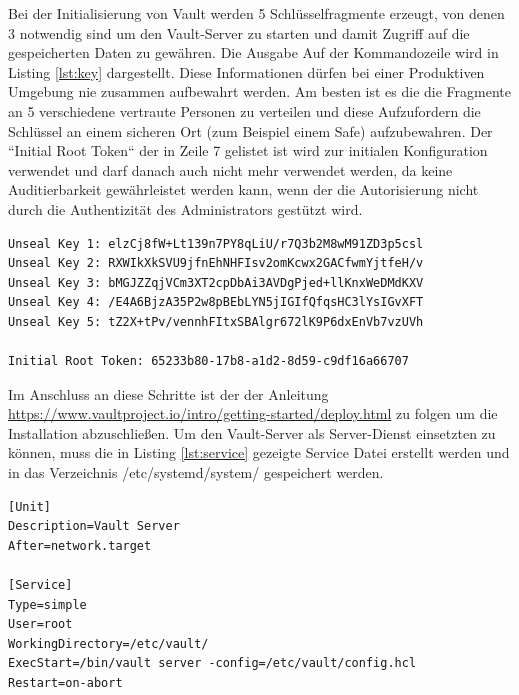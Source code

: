 \documentclass[
book,
a4paper,   
titlepage,  
halfparskip,
12pt        
]{scrartcl}
\begin{document}
\begin{onehalfspacing}
Bei der Initialisierung von Vault werden 5 Schlüsselfragmente erzeugt, von denen 3 notwendig sind um den Vault-Server zu starten und damit Zugriff auf die gespeicherten Daten zu gewähren. Die Ausgabe Auf der Kommandozeile wird in Listing \vref{lst:key} dargestellt.
Diese Informationen dürfen bei einer Produktiven Umgebung nie zusammen aufbewahrt werden. Am besten ist es die die Fragmente an 5 verschiedene vertraute Personen zu verteilen und diese Aufzufordern die Schlüssel an einem sicheren Ort (zum Beispiel einem Safe) aufzubewahren. Der ``Initial Root Token`` der in Zeile 7 gelistet ist wird zur initialen Konfiguration verwendet und darf danach auch nicht mehr verwendet werden, da keine Auditierbarkeit gewährleistet werden kann, wenn der die Autorisierung nicht durch die Authentizität des Administrators gestützt wird.

\begin{lstlisting}[caption={[Initialisierung Vault] Ausgabe der 5 Schlüsselfragmente von denen 3 nötig sind um den Hauptschlüssel zu rekonstruieren}, label=lst:key, captionpos=b, basicstyle=\ttfamily]
Unseal Key 1: elzCj8fW+Lt139n7PY8qLiU/r7Q3b2M8wM91ZD3p5csl
Unseal Key 2: RXWIkXkSVU9jfnEhNHFIsv2omKcwx2GACfwmYjtfeH/v
Unseal Key 3: bMGJZZqjVCm3XT2cpDbAi3AVDgPjed+llKnxWeDMdKXV
Unseal Key 4: /E4A6BjzA35P2w8pBEbLYN5jIGIfQfqsHC3lYsIGvXFT
Unseal Key 5: tZ2X+tPv/vennhFItxSBAlgr672lK9P6dxEnVb7vzUVh

Initial Root Token: 65233b80-17b8-a1d2-8d59-c9df16a66707

\end{lstlisting}


Im Anschluss an diese Schritte ist der der Anleitung \url{https://www.vaultproject.io/intro/getting-started/deploy.html} zu folgen um die Installation abzuschließen. Um den Vault-Server als Server-Dienst einsetzten zu können, muss die in Listing \vref{lst:service} gezeigte Service Datei erstellt werden und in das Verzeichnis /etc/systemd/system/ gespeichert werden.

\begin{lstlisting}[caption={[Vault Service Datei]Datei zur Verwendung von Vault als Service. Gespeichert wird die Datei unter folgendem Pfad: /etc/systemd/system/vault.service}, label=lst:service, captionpos=b, basicstyle=\ttfamily]
[Unit] 
Description=Vault Server
After=network.target

[Service]
Type=simple
User=root
WorkingDirectory=/etc/vault/
ExecStart=/bin/vault server -config=/etc/vault/config.hcl
Restart=on-abort


\end{lstlisting}
\end{onehalfspacing}
\end{document}
